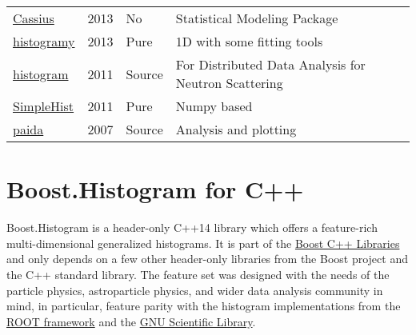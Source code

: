\documentclass{webofc}
\begin{document}
\begin{table}
\begin{tabular}{llll}
		\href{https://github.com/opendatagroup/cassius}{Cassius}                     & 2013         & No     & Statistical Modeling Package                         \\
		\href{https://pypi.org/project/histogramy}{histogramy}                       & 2013         & Pure   & 1D with some fitting tools                           \\
		\href{https://pypi.org/project/histogram}{histogram}                         & 2011         & Source & For Distributed Data Analysis for Neutron Scattering \\
		\href{https://pypi.org/project/SimpleHist/}{SimpleHist}                      & 2011         & Pure   & Numpy based                                          \\
		\href{https://pypi.org/project/paida/}{paida}                                & 2007         & Source & Analysis and plotting                                \\ \hline
	\end{tabular}
\end{table}

\section{Boost.Histogram for C++}
\label{sec-bh-cpp}

%

Boost.Histogram is a header-only C++14 library which offers a feature-rich multi-dimensional generalized histograms. It is part of the \href{https://www.boost.org/}{Boost C++ Libraries} and only depends on a few other header-only libraries from the Boost project and the C++ standard library. The feature set was designed with the needs of the particle physics, astroparticle physics, and wider data analysis community in mind, in particular, feature parity with the histogram implementations from the \href{https://root.cern.ch/}{ROOT framework} and the \href{https://www.gnu.org/software/gsl/}{GNU Scientific Library}.
\end{document}
